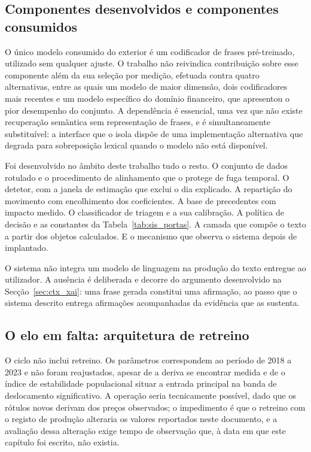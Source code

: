 \subsection{Componentes desenvolvidos e componentes consumidos}

O único modelo consumido do exterior é um codificador de frases pré-treinado, utilizado sem
qualquer ajuste. O trabalho não reivindica contribuição sobre esse componente além da sua seleção
por medição, efetuada contra quatro alternativas, entre as quais um modelo de maior dimensão, dois
codificadores mais recentes e um modelo específico do domínio financeiro, que apresentou o pior
desempenho do conjunto. A dependência é essencial, uma vez que não existe recuperação semântica
sem representação de frases, e é simultaneamente substituível: a interface que o isola dispõe de
uma implementação alternativa que degrada para sobreposição lexical quando o modelo não está
disponível.

Foi desenvolvido no âmbito deste trabalho tudo o resto. O conjunto de dados rotulado e o
procedimento de alinhamento que o protege de fuga temporal. O detetor, com a janela de estimação
que exclui o dia explicado. A repartição do movimento com encolhimento dos coeficientes. A base de
precedentes com impacto medido. O classificador de triagem e a sua calibração. A política de
decisão e as constantes da Tabela~\ref{tab:sis_portas}. A camada que compõe o texto a partir dos
objetos calculados. E o mecanismo que observa o sistema depois de implantado.

O sistema não integra um modelo de linguagem na produção do texto entregue ao utilizador. A
ausência é deliberada e decorre do argumento desenvolvido na Secção~\ref{sec:ctx_xai}: uma frase
gerada constitui uma afirmação, ao passo que o sistema descrito entrega afirmações acompanhadas da
evidência que as sustenta.

\subsection{O elo em falta: arquitetura de retreino}

O ciclo não inclui retreino. Os parâmetros correspondem ao período de 2018 a 2023 e não foram
reajustados, apesar de a deriva se encontrar medida e de o índice de estabilidade populacional
situar a entrada principal na banda de deslocamento significativo. A operação seria tecnicamente
possível, dado que os rótulos novos derivam dos preços observados; o impedimento é que o retreino
com o registo de produção alteraria os valores reportados neste documento, e a avaliação dessa
alteração exige tempo de observação que, à data em que este capítulo foi escrito, não existia.

